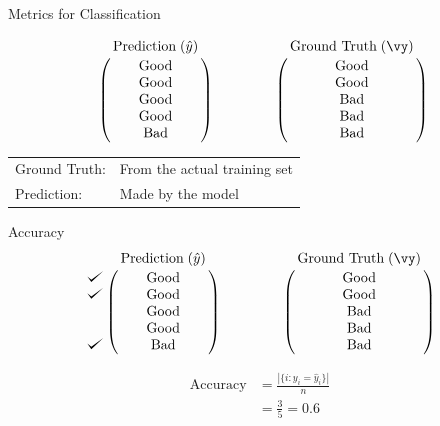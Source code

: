 \documentclass[usenames,dvipsnames]{beamer}
\begin{document}
\begin{frame}{Metrics for Classification}



$$\bordermatrix{&\text{Prediction}\;(\hat{y})\cr
                &\text{Good}\cr
                &\text{Good}\cr
                &\text{Good}\cr
                &\text{Good}\cr
                &\text{Bad}}
                \qquad \qquad
   \bordermatrix{&\text{Ground Truth}\;(\vy)\cr
                &\text{Good}\cr
                &\text{Good}\cr
                &\text{Bad}\cr
                &\text{Bad}\cr
                &\text{Bad}}
$$

\vspace{1cm}

\begin{tabular}{ll}
Ground Truth: & From the actual training set \\ 
Prediction: & Made by the model \\ 
\end{tabular}

\end{frame}

\begin{frame}{Accuracy}
$$
\bordermatrix{&\text{Prediction}\;(\hat{y})\cr
               \checkmark&\text{Good}\cr
               \checkmark&\text{Good}\cr
                &\text{Good}\cr
                &\text{Good}\cr
               \checkmark&\text{Bad}}
\qquad \qquad
\bordermatrix{&\text{Ground Truth}\;(\vy)\cr
                &\text{Good}\cr
                &\text{Good}\cr
                &\text{Bad}\cr
                &\text{Bad}\cr
                &\text{Bad}}
$$

\pause \begin{align*}
\text{Accuracy} &= \frac{|\{i : y_i = \hat{y}_i\}|}{n} \\ 
&= \frac{3}{5} = 0.6
\end{align*}

\end{frame}
\end{document}
